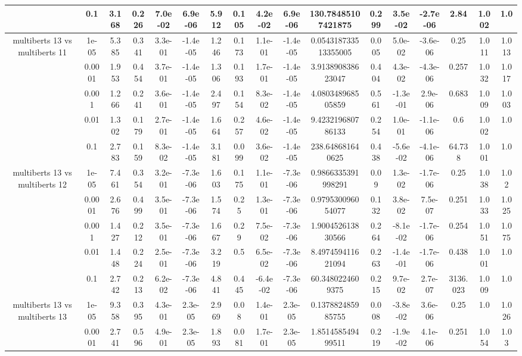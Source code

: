 \begin{tabular}{|c|c|c|c|c|c|c|c|c|c|c|c|c|c|c|c|c|}
 & 0.1 & 3.168 & 0.226 & 7.0e-02 & 6.9e-06 & 5.912 & 0.105 & 4.2e-02 & 6.9e-06 & 130.78485107421875 & 0.299 & 3.5e-02 & -2.7e-06 & 2.84 & 1.002 & 1.0 \\
\hline
\multirow{5}{*}{multiberts 13 vs multiberts 11} & 1e-05 & 5.385 & 0.341 & 3.3e-01 & -1.4e-05 & 1.246 & 0.173 & 1.1e-01 & -1.4e-05 & 0.054318733513355005 & 0.005 & 5.0e-02 & -3.6e-06 & 0.25 & 1.011 & 1.013 \\
 & 0.0001 & 1.953 & 0.454 & 3.7e-01 & -1.4e-05 & 1.306 & 0.193 & 1.7e-01 & -1.4e-05 & 3.913890838623047 & 0.404 & 4.3e-02 & -4.3e-06 & 0.257 & 1.032 & 1.017 \\
 & 0.001 & 1.266 & 0.241 & 3.6e-01 & -1.4e-05 & 2.497 & 0.154 & 8.3e-02 & -1.4e-05 & 4.080348968505859 & 0.561 & -1.3e-01 & 2.9e-06 & 0.683 & 1.009 & 1.003 \\
 & 0.01 & 1.302 & 0.179 & 2.7e-01 & -1.4e-05 & 1.664 & 0.257 & 4.6e-02 & -1.4e-05 & 9.423219680786133 & 0.254 & 1.0e-01 & -1.1e-06 & 0.6 & 1.002 & 1.0 \\
 & 0.1 & 2.783 & 0.159 & 8.3e-02 & -1.4e-05 & 3.181 & 0.099 & 3.6e-02 & -1.4e-05 & 238.648681640625 & 0.438 & -5.6e-02 & -4.1e-06 & 64.738 & 1.001 & 1.0 \\
\hline
\multirow{5}{*}{multiberts 13 vs multiberts 12} & 1e-05 & 7.461 & 0.354 & 3.2e-01 & -7.3e-06 & 1.603 & 0.175 & 1.1e-01 & -7.3e-06 & 0.9866335391998291 & 0.09 & 1.3e-02 & -1.7e-06 & 0.25 & 1.038 & 1.02 \\
 & 0.0001 & 2.676 & 0.499 & 3.5e-01 & -7.3e-06 & 1.574 & 0.25 & 1.3e-01 & -7.3e-06 & 0.979530096054077 & 0.132 & 3.8e-02 & 7.5e-07 & 0.251 & 1.033 & 1.025 \\
 & 0.001 & 1.427 & 0.212 & 3.5e-01 & -7.3e-06 & 1.667 & 0.29 & 7.5e-02 & -7.3e-06 & 1.900452613830566 & 0.264 & -8.1e-02 & -1.7e-06 & 0.254 & 1.051 & 1.075 \\
 & 0.01 & 1.448 & 0.224 & 2.5e-01 & -7.3e-06 & 3.219 & 0.5 & 6.5e-02 & -7.3e-06 & 8.497459411621094 & 0.263 & -1.4e-01 & -1.7e-06 & 0.438 & 1.001 & 1.0 \\
 & 0.1 & 2.742 & 0.213 & 6.2e-02 & -7.3e-06 & 4.841 & 0.445 & -6.4e-02 & -7.3e-06 & 60.3480224609375 & 0.215 & 9.7e-02 & 2.7e-07 & 3136.023 & 1.009 & 1.0 \\
\hline
\multirow{5}{*}{multiberts 13 vs multiberts 13} & 1e-05 & 9.358 & 0.395 & 4.3e-01 & 2.3e-05 & 2.969 & 0.08 & 1.4e-01 & 2.3e-05 & 0.137882485985755 & 0.008 & -3.8e-02 & 3.6e-06 & 0.25 & 1.0 & 1.026 \\
 & 0.0001 & 2.741 & 0.596 & 4.9e-01 & 2.3e-05 & 1.893 & 0.081 & 1.7e-01 & 2.3e-05 & 1.851458549499511 & 0.219 & -1.9e-02 & 4.1e-06 & 0.251 & 1.054 & 1.03 \\

\end{tabular}

